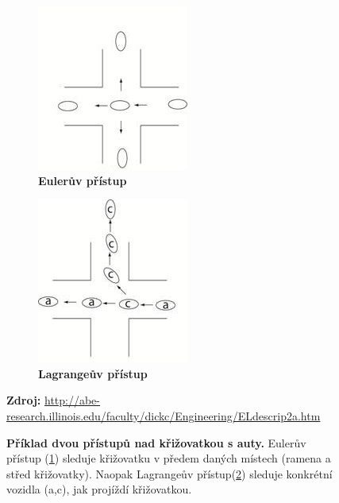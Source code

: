 \begin{figure}[h]
\centering
\begin{subfigure}{.5\textwidth}
  	\centering
	\includegraphics[width=0.7\linewidth]{obrazky-figures/EulerLagran_02.jpg}
	\caption{\textbf{Eulerův přístup}}
	\label{fig:Euler}
\end{subfigure}%
\begin{subfigure}{.5\textwidth}
  	\centering
	\includegraphics[width=0.7\linewidth]{obrazky-figures/EulerLagran_01.jpg}
	\caption{\textbf{Lagrangeův přístup}}
	\label{fig:Lagran}
\end{subfigure}
\caption{\textbf{Příklad dvou přístupů nad křižovatkou s auty.} Eulerův přístup (\ref{fig:Euler}) sleduje křižovatku v předem daných místech (ramena a střed křižovatky). Naopak Lagrangeův přístup(\ref{fig:Lagran}) sleduje konkrétní vozidla (a,c), jak projíždí křižovatkou.}
\textbf{Zdroj:} \url{http://abe-research.illinois.edu/faculty/dickc/Engineering/ELdescrip2a.htm}
\label{fig:ztencovani}
\end{figure}

